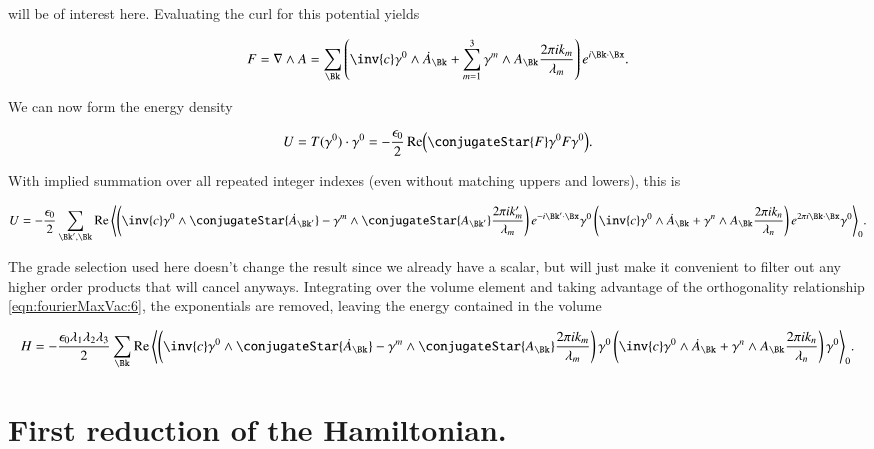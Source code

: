 will be of interest here.  Evaluating the curl for this potential yields

\begin{align}\label{eqn:fourierMaxVac:8}
F = \grad \wedge A
= \sum_{\Bk} \left( \inv{c} \gamma^0 \wedge \dot{A}_\Bk + \sum_{m=1}^3 \gamma^m \wedge A_\Bk \frac{2 \pi i k_m}{\lambda_m} \right) e^{i \Bk \cdot \Bx}.
\end{align}

We can now form the energy density

\begin{align}\label{eqn:fourierMaxVac:9}
U = T(\gamma^0) \cdot \gamma^0
=
-\frac{\epsilon_0}{2} \Real \Bigl( \conjugateStar{F} \gamma^0 F \gamma^0 \Bigr).
\end{align}

With implied summation over all repeated integer indexes (even without matching uppers and lowers), this is

\begin{align}\label{eqn:fourierMaxVac:10}
U =
-\frac{\epsilon_0}{2} \sum_{\Bk', \Bk} \Real \gpgradezero{
\left( \inv{c} \gamma^0 \wedge \conjugateStar{\dot{A}_{\Bk'}} - \gamma^m \wedge \conjugateStar{A_{\Bk'}} \frac{2 \pi i k_m'}{\lambda_m} \right) e^{- i \Bk' \cdot \Bx}
\gamma^0
\left( \inv{c} \gamma^0 \wedge \dot{A}_\Bk + \gamma^n \wedge A_\Bk \frac{2 \pi i k_n}{\lambda_n} \right) e^{2 \pi i \Bk \cdot \Bx}
\gamma^0
}.
\end{align}

The grade selection used here doesn't change the result since we already have a scalar, but will just make it convenient to filter out any higher order products that will cancel anyways.  Integrating over the volume element and taking advantage of the orthogonality relationship \autoref{eqn:fourierMaxVac:6}, the exponentials are removed, leaving the energy contained in the volume

\begin{align}
\label{eqn:fourierMaxVac:11}
H = %
-\frac{\epsilon_0 \lambda_1 \lambda_2 \lambda_3}{2}
\sum_{\Bk} \Real 
\gpgradezero{
\left( \inv{c} \gamma^0 \wedge \conjugateStar{\dot{A}_{\Bk}} - \gamma^m \wedge \conjugateStar{A_{\Bk}} \frac{2 \pi i k_m}{\lambda_m} \right) 
\gamma^0
\left( \inv{c} \gamma^0 \wedge \dot{A}_\Bk + \gamma^n \wedge A_\Bk \frac{2 \pi i k_n}{\lambda_n} \right) 
\gamma^0
}.
\end{align}

\section{First reduction of the Hamiltonian.}

